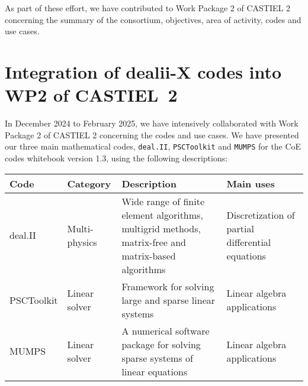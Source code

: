 \documentclass[a4paper,12pt]{article}
\begin{document}
As part of these effort, we have contributed to Work Package 2 of CASTIEL 2
concerning the summary of the consortium, objectives, area of activity, codes
and use cases.

\section{Integration of dealii-X codes into WP2 of CASTIEL~2}

In December 2024 to February 2025, we have intensively collaborated with Work
Package 2 of CASTIEL 2 concerning the codes and use cases. We have presented
our three main mathematical codes, \texttt{deal.II}, \texttt{PSCToolkit} and
\texttt{MUMPS} for the CoE codes whitebook version 1.3, using the following
descriptions:


{\small
  \noindent
  \renewcommand{\arraystretch}{2.5}
\begin{tabular}{llll}
  \hline
  \textbf{Code} & \textbf{Category} & \textbf{Description} & \textbf{Main uses} \\
  \hline
  deal.II & \begin{minipage}{0.1\textwidth}Multi-physics\end{minipage} & \begin{minipage}{0.4\textwidth}
    Wide range of finite element algorithms, multigrid methods, matrix-free and matrix-based algorithms
  \end{minipage}
                                & \begin{minipage}{0.26\textwidth}Discretization of partial differential equations\end{minipage}
  \\
  PSCToolkit & \begin{minipage}{0.1\textwidth}Linear solver\end{minipage} &\begin{minipage}{0.4\textwidth}
  Framework for solving large and sparse linear systems 
  \end{minipage}
                                & \begin{minipage}{0.26\textwidth}Linear algebra applications\end{minipage}
  \\
  MUMPS & \begin{minipage}{0.1\textwidth}Linear solver\end{minipage} &\begin{minipage}{0.4\textwidth}
  A numerical software package for solving sparse systems of linear equations
  \end{minipage}
                                                           & \begin{minipage}{0.26\textwidth}Linear algebra applications\end{minipage}
  \\
  \hline
\end{tabular}
}
\end{document}
